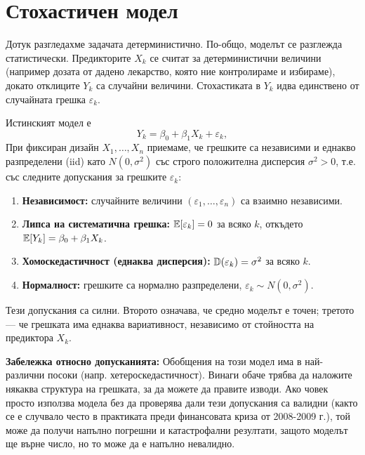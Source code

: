 \section{Стохастичен модел}

Дотук разгледахме задачата детерминистично. По-общо, моделът се разглежда статистически. Предикторите $X_k$ се считат за детерминистични величини (например дозата от дадено лекарство, която ние контролираме и избираме), докато отклиците $Y_k$ са случайни величини. Стохастиката в $Y_k$ идва единствено от случайната грешка $\varepsilon_k$.

\begin{keydefn}\label{def:slr}
Истинският модел е
\[
Y_k = \beta_0 + \beta_1 X_k + \varepsilon_k ,
\]
При фиксиран дизайн $X_1,\ldots,X_n$ приемаме, че грешките са независими и еднакво разпределени (iid) като $N(0,\sigma^2)$ със строго положителна дисперсия $\sigma^2>0$, т.е. със следните допускания за грешките $\varepsilon_k$:
\begin{enumerate}
    \item \textbf{Независимост:} случайните величини $(\varepsilon_1, \dots, \varepsilon_n)$ са взаимно независими.
    \item \textbf{Липса на систематична грешка:} $\mathbb{E}[\varepsilon_k] = 0$ за всяко $k$, откъдето $\mathbb{E}[Y_k] = \beta_0 + \beta_1 X_k$.
    \item \textbf{Хомоскедастичност (еднаква дисперсия):} $\mathbb{D}(\varepsilon_k) = \sigma^2$ за всяко $k$.
    \item \textbf{Нормалност:} грешките са нормално разпределени, $\varepsilon_k \sim N(0, \sigma^2)$.
\end{enumerate}
\end{keydefn}

Тези допускания са силни. Второто означава, че средно моделът е точен; третото — че грешката има еднаква вариативност, независимо от стойността на предиктора $X_k$.

\textbf{Забележка относно допусканията:} Обобщения на този модел има в най-различни посоки (напр. хетероскедастичност). Винаги обаче трябва да наложите някаква структура на грешката, за да можете да правите изводи. Ако човек просто използва модела без да проверява дали тези допускания са валидни (както се е случвало често в практиката преди финансовата криза от 2008-2009 г.), той може да получи напълно погрешни и катастрофални резултати, защото моделът ще върне число, но то може да е напълно невалидно.

